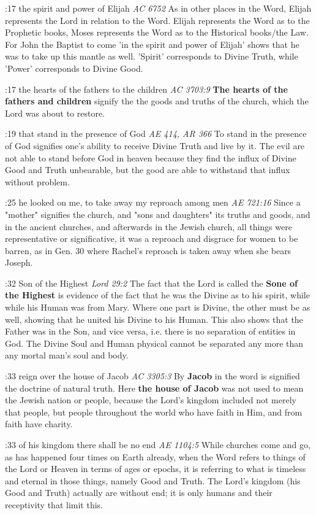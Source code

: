 :17 {the spirit and power of Elijah}
{\it AC 6752} As in other places in the Word, Elijah represents the Lord in relation to the Word. Elijah represents the Word as to the Prophetic books, Moses represents the Word as to the Historical books/the Law. For John the Baptist to come 'in the spirit and power of Elijah' shows that he was to take up this mantle as well. 'Spirit' corresponds to Divine Truth, while 'Power' corresponds to Divine Good. 

:17 {the hearts of the fathers to the children}
{\it AC 3703:9} {\bf The hearts of the fathers and children} signify the the goods and truths of the church, which the Lord was about to restore.

:19 {that stand in the presence of God}
{\it AE 414, AR 366} To stand in the presence of God signifies one's ability to receive Divine Truth and live by it. The evil are not able to stand before God in heaven because they find the influx of Divine Good and Truth unbearable, but the good are able to withstand that influx without problem.

:25 {he looked on me, to take away my reproach among men}
{\it AE 721:16} Since a "mother" signifies the church, and "sons and daughters" its truths and goods, and in the ancient churches, and afterwards in the Jewish church, all things were representative or significative, it was a reproach and disgrace for women to be barren, as in Gen. 30 where Rachel's reproach is taken away when she bears Joseph.

:32 {Son of the Highest}
{\it Lord 29:2} The fact that the Lord is called the {\bf Sone of the Highest} is evidence of the fact that he was the Divine as to his spirit, while while his Human was from Mary. Where one part is Divine, the other must be as well, showing that he united his Divine to his Human. This also shows that the Father was in the Son, and vice versa, i.e. there is no separation of entities in God. The Divine Soul and Human physical cannot be separated any more than any mortal man's soul and body.

:33 {reign over the house of Jacob}
{\it AC 3305:3} By {\bf Jacob} in the word is signified the doctrine of natural truth. Here {\bf the house of Jacob} was not used to mean the Jewish nation or people, because the Lord's kingdom included not merely that people, but people throughout the world who have faith in Him, and from faith have charity.

:33 {of his kingdom there shall be no end}
{\it AE 1104:5} While churches come and go, as has happened four times on Earth already, when the Word refers to things of the Lord or Heaven in terms of ages or epochs, it is referring to what is timeless and eternal in those things, namely Good and Truth. The Lord's kingdom (his Good and Truth) actually are without end; it is only humans and their receptivity that limit this.

